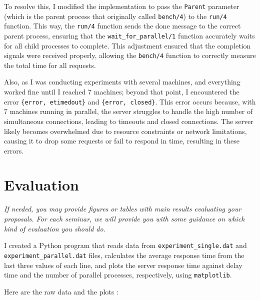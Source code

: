 \documentclass[a4paper, 11pt]{article}
\begin{document}
\hfill 

To resolve this, I modified the implementation to pass the \texttt{Parent} parameter (which is the parent process that originally called \texttt{bench/4}) to the \texttt{run/4} function. This way, the \texttt{run/4} function sends the done message to the correct parent process, ensuring that the \texttt{wait\_for\_parallel/1} function accurately waits for all child processes to complete. This adjustment ensured that the completion signals were received properly, allowing the \texttt{bench/4} function to correctly measure the total time for all requests.

\hfill

Also, as I was conducting experiments with several machines, and everything worked fine until I reached 7 machines; beyond that point, I encountered the error \texttt{\{error, etimedout\}} and \texttt{\{error, closed\}}. This error occurs because, with 7 machines running in parallel, the server struggles to handle the high number of simultaneous connections, leading to timeouts and closed connections. The server likely becomes overwhelmed due to resource constraints or network limitations, causing it to drop some requests or fail to respond in time, resulting in these errors.

\section{Evaluation}

\textit{If needed, you may provide figures or tables with main results
  evaluating your proposals. For each seminar, we will provide you
  with some guidance on which kind of evaluation you should do.}

I created a Python program that reads data from \texttt{experiment\_single.dat} and \texttt{experiment\_parallel.dat} files, calculates the average response time from the last three values of each line, and plots the server response time against delay time and the number of parallel processes, respectively, using \texttt{matplotlib}.

\hfill 

Here are the raw data and the plots :
\end{document}
